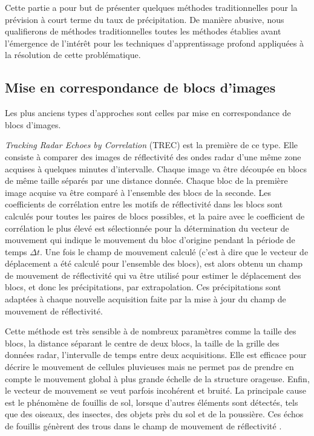 \documentclass[12pt,a4paper,french]{article}
\newcommand\subsecspacing{1cm}
\begin{document}
Cette partie a pour but de présenter quelques méthodes traditionnelles pour la prévision à court terme du taux de précipitation. De manière abusive, nous qualifierons de méthodes traditionnelles toutes les méthodes établies avant l'émergence de l'intérêt pour les techniques d'apprentissage profond appliquées à la résolution de cette problématique.

\vspace{\subsecspacing}

\subsection{Mise en correspondance de blocs d'images}

Les plus anciens types d'approches sont celles par mise en correspondance de blocs d'images. \newline

\textit{Tracking Radar Echoes by Correlation} (TREC) \cite{Rinehart:1978} est la première de ce type. Elle consiste à comparer des images de réflectivité des ondes radar d'une même zone acquises à quelques minutes d'intervalle. Chaque image va être découpée en blocs de même taille séparés par une distance donnée. Chaque bloc de la première image acquise va être comparé à l'ensemble des blocs de la seconde. Les coefficients de corrélation entre les motifs de réflectivité dans les blocs sont calculés pour toutes les paires de blocs possibles, et la paire avec le coefficient de corrélation le plus élevé est sélectionnée pour la détermination du vecteur de mouvement qui indique le mouvement du bloc d'origine pendant la période de temps $ \Delta{t} $.
Une fois le champ de mouvement calculé (c'est à dire que le vecteur de déplacement a été calculé pour l'ensemble des blocs), est alors obtenu un champ de mouvement de réflectivité qui va être utilisé pour estimer le déplacement des blocs, et donc les précipitations, par extrapolation. Ces précipitations sont adaptées à chaque nouvelle acquisition faite par la mise à jour du champ de mouvement de réflectivité. 

Cette méthode est très sensible à de nombreux paramètres comme la taille des blocs, la distance séparant le centre de deux blocs, la taille de la grille des données radar, l'intervalle de temps entre deux acquisitions. Elle est efficace pour décrire le mouvement de cellules pluvieuses mais ne permet pas de prendre en compte le mouvement global à plus grande échelle de la structure orageuse. Enfin, le vecteur de mouvement se veut parfois incohérent et bruité. La principale cause est le phénomène de fouillis de sol, lorsque d'autres éléments sont détectés, tels que des oiseaux, des insectes, des objets près du sol et de la poussière. Ces échos de fouillis génèrent des trous dans le champ de mouvement de réflectivité \cite{1995JApMe..34.1286L}. \newline
\end{document}
